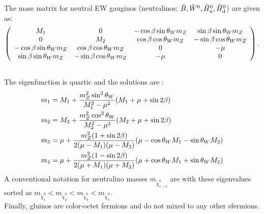The mass matrix for neutral EW gauginos (neutralinos; $\tilde{B}, \tilde{W}^0, \tilde{H}^0_{\mathrm{u}}, \tilde{H}^0_{\mathrm{d}}$) are given as:
\begin{align}
\left(  
  \begin{array}{cccc}
    M_1                       &  0                         & -\cos\beta\sin\theta_W m_Z &  \sin\beta\sin\theta_W m_Z   \\
    0                         &  M_2                       &  \cos\beta\cos\theta_W m_Z & -\sin\beta\cos\theta_W m_Z   \\
   -\cos\beta\sin\theta_W m_Z &  \cos\beta\cos\theta_W m_Z &  0                         & -\mu                         \\
    \sin\beta\sin\theta_W m_Z & -\sin\beta\cos\theta_W m_Z & -\mu                       &  0                           \\
  \end{array}
\right). \nonumber \\ \nonumber
\end{align}
The eigenfunction is quartic and the solutions are :
\begin{align}
m_1 & = M_1 + \frac{m_Z^2\sin^2{\theta_W}}{M_1^2-\mu^2} (M_1 + \mu+\sin2\beta)   \nonumber \\
m_2 & = M_2 + \frac{m_Z^2\cos^2{\theta_W}}{M_2^2-\mu^2} (M_2 + \mu+\sin2\beta)   \nonumber \\
m_3 & = \mu + \frac{m_Z^2(1+\sin{2\beta})}{2(\mu-M_1)(\mu-M_2)} (\mu-\cos{\theta_W}M_1-\sin{\theta_W}M_2)  \nonumber \\
m_4 & = \mu + \frac{m_Z^2(1-\sin{2\beta})}{2(\mu+M_1)(\mu+M_2)} (\mu+\cos{\theta_W}M_1+\sin{\theta_W}M_2)  \nonumber \\
\end{align}
A conventional notation for neutralino masses $m_{\tilde{\chi}_{1-4}^0}$ are with these eigenvalues sorted as $m_{\tilde{\chi}_{1}^0}<m_{\tilde{\chi}_{2}^0}<m_{\tilde{\chi}_{3}^0}<m_{\tilde{\chi}_{4}^0}$. \\

Finally, gluinos are color-octet fermions and do not mixed to any other sfermions. \\



